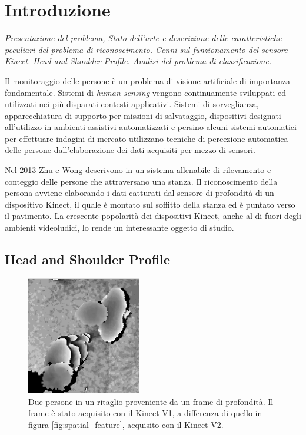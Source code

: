 
\chapter{Introduzione}
\label{cap:Introduzione}
\emph{Presentazione del problema, Stato dell'arte e descrizione delle caratteristiche peculiari del problema di riconoscimento.
Cenni sul funzionamento del sensore Kinect.
Head and Shoulder Profile.
Analisi del problema di classificazione.}

Il monitoraggio delle persone è un problema di visione artificiale di importanza fondamentale.
Sistemi di \emph{human sensing} vengono continuamente sviluppati ed utilizzati nei più disparati contesti applicativi. Sistemi di sorveglianza, apparecchiatura di supporto per missioni di salvataggio, dispositivi designati all'utilizzo in ambienti assistivi automatizzati e persino alcuni sistemi automatici per effettuare indagini di mercato utilizzano tecniche di percezione automatica delle persone dall'elaborazione dei dati acquisiti per mezzo di sensori.

Nel 2013 Zhu e Wong descrivono in \cite{Zhu13} un sistema allenabile di rilevamento e conteggio delle persone che attraversano una stanza.
Il riconoscimento della persona avviene elaborando i dati catturati dal sensore di profondità di un dispositivo Kinect, il quale è montato sul soffitto della stanza ed è puntato verso il pavimento. La crescente popolarità dei dispositivi Kinect, anche al di fuori degli ambienti videoludici, lo rende un interessante oggetto di studio.

\section{Head and Shoulder Profile}
\label{sec:hasp}
\begin{figure}
    \centering
    \includegraphics[width=5cm]{img/no_occlusion.png}
    \caption{Due persone in un ritaglio proveniente da un frame di profondità. Il frame è stato acquisito con il Kinect V1, a differenza di quello in figura \ref{fig:spatial_feature}, acquisito con il Kinect V2.}
    \label{fig:no_occlusion}
\end{figure}

